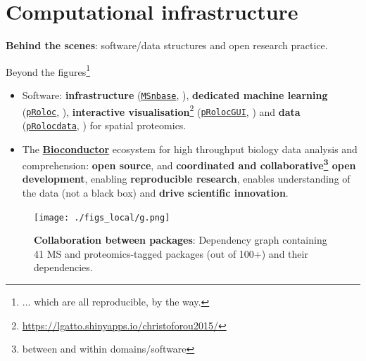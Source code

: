 \section{Computational infrastructure}

\begin{frame}{}
  \begin{center}
    \Large{\textbf{Behind the scenes}: software/data structures and
      open research practice.}
  \end{center}
\end{frame}


\begin{frame}{}

  Beyond the figures\footnote{... which are all reproducible, by the way.}

  \begin{itemize}
  \item<+-> Software: \textbf{infrastructure}
    (\href{http://bioconductor.org/packages/MSnbase}{\texttt{MSnbase}},
    \cite{Gatto:2012}), \textbf{dedicated machine learning}
    (\href{http://bioconductor.org/packages/pRoloc}{\texttt{pRoloc}},
    \cite{Gatto:2014a}), \textbf{interactive
      visualisation}\footnote{\url{https://lgatto.shinyapps.io/christoforou2015/}}
    (\href{http://bioconductor.org/packages/pRolocGUI}{\texttt{pRolocGUI}},
    \cite{pRolocGUI}) and \textbf{data}
    (\href{http://bioconductor.org/packages/pRolocdata}{\texttt{pRolocdata}},
    \cite{Gatto:2014a}) for spatial proteomics.
  \item<+-> The \href{http://bioconductor.org/}{\textbf{Bioconductor}}
    \citep{Huber:2015} ecosystem for high throughput biology data
    analysis and comprehension: \textbf{open source}, and
    \textbf{coordinated and collaborative\footnote{between and within
        domains/software} open development}, enabling
    \textbf{reproducible research}, enables understanding of the data
    (not a black box) and \textbf{drive scientific innovation}.
  \end{itemize}
\end{frame}


\begin{frame}
  \begin{figure}[h]
    \centering
    \texttt{[image: ./figs\_local/g.png]}
    \caption{\textbf{Collaboration between packages}: Dependency graph
      containing 41 MS and proteomics-tagged packages (out of 100+)
      and their dependencies. }
  \end{figure}
\end{frame}

